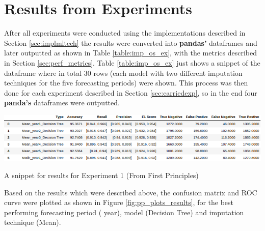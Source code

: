\section{Results from Experiments}\label{sec:expresults}
After all experiments were conducted using the implementations described in Section \ref{sec:implmltech} the results were converted into \textbf{pandas’} dataframes and later outputted as shown in Table \ref{table:imp_os_ex}, with the metrics described in Section \ref{sec:perf_metrics}. Table \ref{table:imp_os_ex} just shows a snippet of the dataframe where in total 30 rows (each model with two different imputation techniques for the five forecasting periods) were shown. This process was then done for each experiment described in Section \ref{sec:carriedexp}, so in the end four \textbf{panda’s} dataframes were outputted. 
\begin{table}[H]
\centering
  \includegraphics[scale = .7]{imgs/imp_os_pp.png}
  \caption{A snippet for results for Experiment 1 (From First Principles)}
  \label{table:imp_os_ex}
\end{table}
\noindent Based on the results which were described above, the confusion matrix and ROC curve were plotted as shown in Figure \ref{fig:pp_plots_results}, for the best performing forecasting period ( year), model (Decision Tree) and imputation technique (Mean). 
